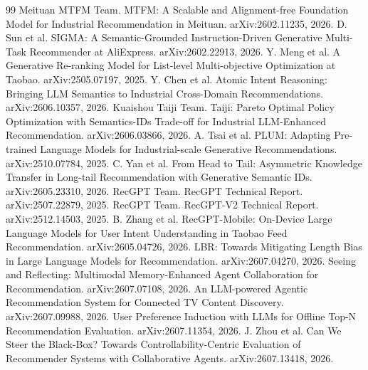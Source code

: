 \documentclass[UTF8,fontset=fandol,11pt]{ctexart}
\begin{document}
\begin{thebibliography}{99}
 Meituan MTFM Team. MTFM: A Scalable and Alignment-free Foundation Model for Industrial Recommendation in Meituan. arXiv:2602.11235, 2026.
 D. Sun et al. SIGMA: A Semantic-Grounded Instruction-Driven Generative Multi-Task Recommender at AliExpress. arXiv:2602.22913, 2026.
 Y. Meng et al. A Generative Re-ranking Model for List-level Multi-objective Optimization at Taobao. arXiv:2505.07197, 2025.
 Y. Chen et al. Atomic Intent Reasoning: Bringing LLM Semantics to Industrial Cross-Domain Recommendations. arXiv:2606.10357, 2026.
 Kuaishou Taiji Team. Taiji: Pareto Optimal Policy Optimization with Semantics-IDs Trade-off for Industrial LLM-Enhanced Recommendation. arXiv:2606.03866, 2026.
 A. Tsai et al. PLUM: Adapting Pre-trained Language Models for Industrial-scale Generative Recommendations. arXiv:2510.07784, 2025.
 C. Yan et al. From Head to Tail: Asymmetric Knowledge Transfer in Long-tail Recommendation with Generative Semantic IDs. arXiv:2605.23310, 2026.
 RecGPT Team. RecGPT Technical Report. arXiv:2507.22879, 2025.
 RecGPT Team. RecGPT-V2 Technical Report. arXiv:2512.14503, 2025.
 B. Zhang et al. RecGPT-Mobile: On-Device Large Language Models for User Intent Understanding in Taobao Feed Recommendation. arXiv:2605.04726, 2026.
 LBR: Towards Mitigating Length Bias in Large Language Models for Recommendation. arXiv:2607.04270, 2026.
 Seeing and Reflecting: Multimodal Memory-Enhanced Agent Collaboration for Recommendation. arXiv:2607.07108, 2026.
 An LLM-powered Agentic Recommendation System for Connected TV Content Discovery. arXiv:2607.09988, 2026.
 User Preference Induction with LLMs for Offline Top-N Recommendation Evaluation. arXiv:2607.11354, 2026.
 J. Zhou et al. Can We Steer the Black-Box? Towards Controllability-Centric Evaluation of Recommender Systems with Collaborative Agents. arXiv:2607.13418, 2026.
\end{thebibliography}
\end{document}
